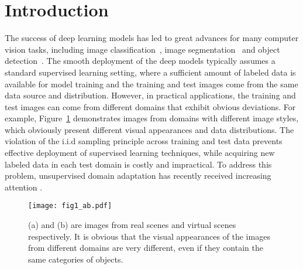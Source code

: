 \documentclass[runningheads]{llncs}
\begin{document}
\section{Introduction}
The success of deep learning models has 
led to great advances for many computer vision tasks, including
image classification~\cite{simonyan2014very,szegedy2015going,he2016deep}, 
image segmentation~\cite{Long_2015_CVPR,Zhao_2017_CVPR} 
and object detection~\cite{girshick2015fast,ren2015faster,liu2016ssd,redmon2018yolov3}. 
The smooth deployment of the deep models 
typically assumes a standard supervised learning setting,
where a sufficient amount of labeled data is available for model training
and the training and test images come from the same data source and distribution.
However, in practical applications, the training and test images can come from 
different domains that exhibit obvious deviations. 
For example, Figure~\ref{fig:one} demonstrates images 
from domains with different image styles, which obviously present 
different visual appearances and data distributions.
The violation of the i.i.d sampling principle across training and test data
prevents effective deployment of supervised learning techniques,
while acquiring new labeled data in each test domain is costly and impractical. 
To address this problem, unsupervised domain adaptation has recently received
increasing attention
\cite{ganin2016domain,tzeng2017adversarial,long2018conditional,cicek2019unsupervised}. 

\begin{figure}[t]
\begin{center}
\texttt{[image: fig1\_ab.pdf]}
\end{center}
\caption{ 
   (a) and (b) are images from real scenes and virtual scenes respectively.
	It is obvious that the visual appearances of the images from different domains are very different,
	even if they contain the same categories of objects.
}
\label{fig:one}
\end{figure}
\end{document}
